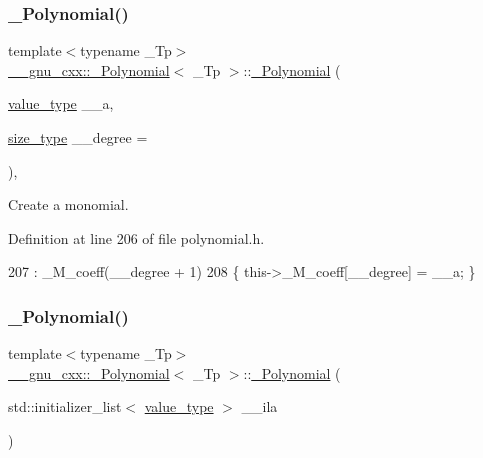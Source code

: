 \subsubsection{\texorpdfstring{\+\_\+\+Polynomial()}{\_Polynomial()}\hspace{0.1cm}{\footnotesize\ttfamily [5/9]}}
{\footnotesize\ttfamily template$<$typename \+\_\+\+Tp$>$ \\
\hyperlink{class____gnu__cxx_1_1__Polynomial}{\+\_\+\+\_\+gnu\+\_\+cxx\+::\+\_\+\+Polynomial}$<$ \+\_\+\+Tp $>$\+::\hyperlink{class____gnu__cxx_1_1__Polynomial}{\+\_\+\+Polynomial} (\begin{DoxyParamCaption}\item[{\hyperlink{class____gnu__cxx_1_1__Polynomial_a725563351f50e76084a7a016c06f8a53}{value\+\_\+type}}]{\+\_\+\+\_\+a,  }\item[{\hyperlink{class____gnu__cxx_1_1__Polynomial_a8b25fcfd4acaad0c5c08b649c22da28a}{size\+\_\+type}}]{\+\_\+\+\_\+degree = {} }\end{DoxyParamCaption})\hspace{0.3cm}{\ttfamily [inline]}, {\ttfamily [explicit]}}

Create a monomial. 

Definition at line 206 of file polynomial.\+h.


\begin{DoxyCode}
207       : \_M\_coeff(\_\_degree + 1)
208       \{ this->\_M\_coeff[\_\_degree] = \_\_a; \}
\end{DoxyCode}
\mbox{\label{class____gnu__cxx_1_1__Polynomial_acc6b7b2a52600f62bf8dee99f2fb787c}} 
\subsubsection{\texorpdfstring{\+\_\+\+Polynomial()}{\_Polynomial()}\hspace{0.1cm}{\footnotesize\ttfamily [6/9]}}
{\footnotesize\ttfamily template$<$typename \+\_\+\+Tp$>$ \\
\hyperlink{class____gnu__cxx_1_1__Polynomial}{\+\_\+\+\_\+gnu\+\_\+cxx\+::\+\_\+\+Polynomial}$<$ \+\_\+\+Tp $>$\+::\hyperlink{class____gnu__cxx_1_1__Polynomial}{\+\_\+\+Polynomial} (\begin{DoxyParamCaption}\item[{std\+::initializer\+\_\+list$<$ \hyperlink{class____gnu__cxx_1_1__Polynomial_a725563351f50e76084a7a016c06f8a53}{value\+\_\+type} $>$}]{\+\_\+\+\_\+ila }\end{DoxyParamCaption})\hspace{0.3cm}{\ttfamily [inline]}}

